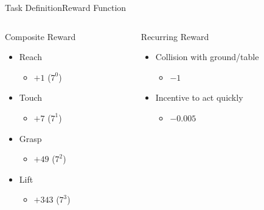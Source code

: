 \begin{frame}{Task Definition}{Reward Function}
    \begin{columns}%
        \begin{column}{0.5\textwidth}%
            \begin{block}{Composite Reward}
                \begin{itemize}
                    \item Reach
                          \begin{itemize}
                              \item \(+1\) (\(7^{0}\))
                          \end{itemize}
                    \item Touch
                          \begin{itemize}
                              \item \(+7\) (\(7^{1}\))
                          \end{itemize}
                    \item Grasp
                          \begin{itemize}
                              \item \(+49\) (\(7^{2}\))
                          \end{itemize}
                    \item Lift
                          \begin{itemize}
                              \item \(+343\) (\(7^{3}\))
                          \end{itemize}
                \end{itemize}
            \end{block}
        \end{column}
        \begin{column}{0.5\textwidth}%
            \begin{block}{Recurring Reward}
                \begin{itemize}
                    \item Collision with ground/table
                          \begin{itemize}
                              \item \(-1\)
                          \end{itemize}
                    \item Incentive to act quickly
                          \begin{itemize}
                              \item \(-0.005\)
                          \end{itemize}
                \end{itemize}
            \end{block}
        \end{column}
    \end{columns}
\end{frame}


